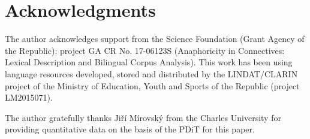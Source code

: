 \documentclass[output=paper]{langsci/langscibook.cls}
\begin{document}
\section*{Acknowledgments}

The author acknowledges support from the  Science Foundation (Grant Agency of the  Republic): project GA CR No. 17-06123S (Anaphoricity in Connectives: Lexical Description and Bilingual Corpus Analysis).
This work has been using language resources developed, stored and distributed by the LINDAT/CLARIN project of the Ministry of Education, Youth and Sports of the  Republic (project LM2015071).

The author gratefully thanks Jiří Mírovský from the Charles University for providing quantitative data on the basis of the PDiT for this paper.

\newpage
{\sloppy
\printbibliography[heading=subbibliography,notkeyword=this] 
}
\end{document}
